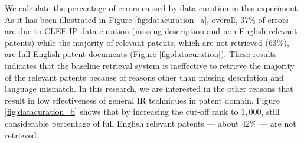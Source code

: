 We calculate the percentage of errors caused by data curation in this experiment. As it has been illustrated in Figure \ref{fig:datacuration_a}, overall, $37\%$ of errors are due to CLEF-IP data curation (missing description and non-English relevant patents) while the majority of relevant patents, which are not retrieved ($63\%$), are full English patent documents (Figure \ref{fig:datacuration}). These results indicates that the baseline retrieval system is ineffective to retrieve the majority of the relevant patents because of reasons other than missing description and language mismatch. In this research, we are interested in the other reasons that result in low effectiveness of general IR techniques in patent domain. Figure \ref{fig:datacuration_b} shows that by increasing the cut-off rank to $1,000$, still considerable percentage of full English relevant patents --- about $42\%$ --- are not retrieved.








